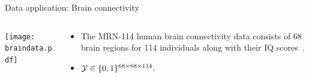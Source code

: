 \documentclass[10pt, mathserif]{beamer} %
\theoremstyle{definition}
\theoremstyle{plain}
\begin{document}
\begin{frame}{Data application: Brain connectivity}
\begin{columns}
\begin{column}{0.21\textwidth}
   \begin{center}
     \texttt{[image: braindata.pdf]}
     \end{center}
\end{column}
\begin{column}{0.7\textwidth} 
\begin{itemize}
    \item The MRN-114 human brain connectivity data consists of 68 brain regions for 114 individuals along with their IQ scores~\citep{wang2017bayesian}.
    \item  $\mathcal{Y}\in\{0,1\}^{68\times68\times114}.$
\end{itemize}
\end{column}
\end{columns}
\end{frame}
\end{document}
